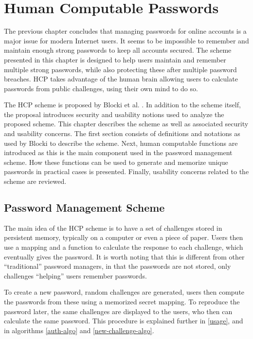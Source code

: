 \chapter{Human Computable Passwords}\label{ch:hcp}
The previous chapter concludes that managing passwords for online accounts is a major issue for modern Internet users. It seems to be impossible to remember and maintain enough strong passwords to keep all accounts secured. The scheme presented in this chapter is designed to help users maintain and remember multiple strong passwords, while also protecting these after multiple password breaches. HCP takes advantage of the human brain allowing users to calculate passwords from public challenges, using their own mind to do so. 

\par The HCP scheme is proposed by Blocki et al. \cite{hcp-blocki}. In addition to the scheme itself, the proposal introduces security and usability notions used to analyze the proposed scheme. This chapter describes the scheme as well as associated security and usability concerns. The first section consists of definitions and notations as used by Blocki \cite{hcp-blocki} to describe the scheme. Next, human computable functions are introduced as this is the main component used in the password management scheme. How these functions can be used to generate and memorize unique passwords in practical cases is presented. Finally, usability concerns related to the scheme are reviewed.

\section{Password Management Scheme}
The main idea of the HCP scheme is to have a set of challenges stored in persistent memory, typically on a computer or even a piece of paper. Users then use a mapping and a function to calculate the response to each challenge, which eventually gives the password. It is worth noting that this is different from other ``traditional'' password managers, in that the passwords are not stored, only challenges ``helping'' users remember passwords. 
\par To create a new password, random challenges are generated, users then compute the passwords from these using a memorized secret mapping. To reproduce the password later, the same challenges are displayed to the users, who then can calculate the same password. This procedure is explained further in \autoref{usage}, and in algorithms \ref{auth-algo} and \ref{new-challenge-algo}.

